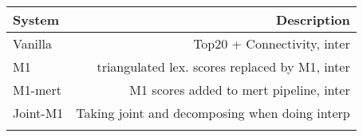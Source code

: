 \begin{tabular}{lr}
\toprule


System & Description\\
  \toprule
Vanilla & Top20 + Connectivity, inter \\ \toprule
M1 &  triangulated lex. scores replaced by M1, inter\\ \toprule
M1-mert &  M1 scores added to mert pipeline, inter\\ \toprule
Joint-M1 & Taking joint and decomposing when doing interp\\ 
\bottomrule
\label{table:systems}
\end{tabular}

